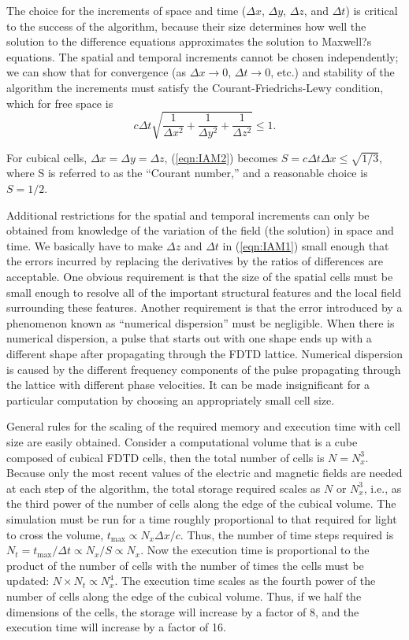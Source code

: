 The choice for the increments of space and time ($\Delta x$, $\Delta y$, $\Delta z$, and $\Delta t$) is critical to the success of the algorithm, because their size determines how well the solution to the difference equations approximates the solution to Maxwell?s equations. The spatial and temporal increments cannot be chosen independently; we can show that for convergence (as $\Delta x\rightarrow 0$, $\Delta t\rightarrow 0$, etc.) and stability of the algorithm the increments must satisfy the Courant-Friedrichs-Lewy condition, which for free space is
\begin{equation}
c \Delta t \sqrt{ \frac{1}{\Delta x^2} +  \frac{1}{\Delta y^2} + \frac{1}{\Delta z^2} } \leq 1.
\label{eqn:IAM2}
\end{equation}

For cubical cells, $\Delta x = \Delta y = \Delta z$, (\ref{eqn:IAM2}) becomes $S=c \Delta t \Delta x \leq \sqrt{1/3}$, where S is referred to as the ``Courant number,'' and a  reasonable choice is $S=1/2$.

Additional restrictions for the spatial and temporal increments can only be obtained from knowledge of the variation of the field (the solution) in space and time. We basically have to make $\Delta z$ and $\Delta t$ in (\ref{eqn:IAM1}) small enough that the errors incurred by replacing the derivatives by the ratios of differences are acceptable. One obvious requirement is that the size of the spatial cells must be small enough to resolve all of the important structural features and the local field surrounding these features. Another requirement is that the error introduced by a phenomenon known as ``numerical dispersion'' must be negligible.  When there is numerical dispersion, a pulse that starts out with one shape ends up with a different shape after propagating through the FDTD lattice. Numerical dispersion is caused by the different frequency components of the pulse propagating through the lattice with different phase velocities. It can be made insignificant for a particular computation by choosing an appropriately small cell size.

General rules for the scaling of the required memory and execution time with cell size are easily obtained. Consider a computational volume that is a cube composed of cubical FDTD cells, then the total number of cells is $N=N^3_x$. Because only the most recent values of the electric and magnetic fields are needed at each step of the algorithm, the total storage required scales as $N$ or $N^3_x$, i.e., as the third power of the number of cells along the edge of the cubical volume. The simulation must be run for a time roughly proportional to that required for light to cross the volume, $t_\text{max}\propto N_x \Delta x/c$. Thus, the number of time steps required is $N_t = t_\text{max}/\Delta t \propto N_x/S \propto N_x$. Now the execution time is proportional to the product of the number of cells with the number of times the cells must be updated: $N \times N_t \propto N^4_x$. The execution time scales as the fourth power of the number of cells along the edge of the cubical volume. Thus, if we half the dimensions of the cells, the storage will increase by a factor of 8, and the execution time will increase by a factor of 16.

